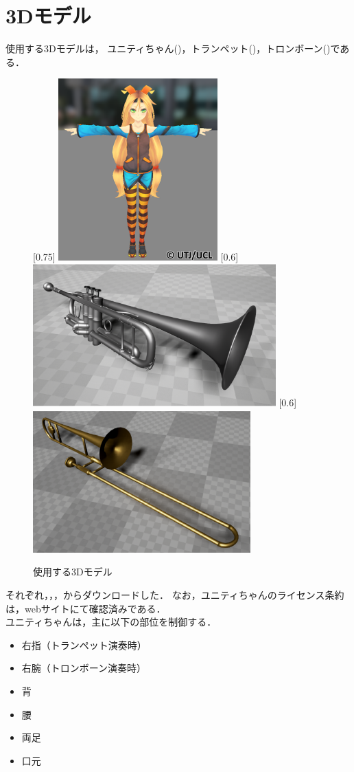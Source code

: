 \section{3Dモデル} \label{sec:3Dmodel}
使用する3Dモデルは，
ユニティちゃん()，トランペット()，トロンボーン()である．
\begin{figure}[t]
	\centering
	[0.75\linewidth]{
		\includegraphics[height=7cm]{fig/chap3/unity.eps}}
	[0.6\linewidth]{
		\includegraphics[height=5.5cm]{fig/chap3/tp.eps}}
	[0.6\linewidth]{
		\includegraphics[height=5.5cm]{fig/chap3/tb.eps}}
	\caption{使用する3Dモデル}
	\label{fig:model}
\end{figure}
それぞれ，\cite{unity}，\cite{tp}，\cite{tb}からダウンロードした．
なお，ユニティちゃんのライセンス条約は，webサイト\cite{license}にて確認済みである．\\
\indent
ユニティちゃんは，主に以下の部位を制御する．
\begin{itemize}
	\item 右指（トランペット演奏時）
	\item 右腕（トロンボーン演奏時）
	\item 背
	\item 腰
	\item 両足
	\item 口元
\end{itemize}
